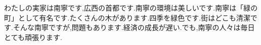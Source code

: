 わたしの実家は南寧です,広西の首都です.南寧の環境は美しいです.南寧は「緑の町」として有名です.たくさんの木があります.四季を緑色です.街はどこも清潔です.そんな南寧ですが,問題もあります.経済の成長が遅い.でも,南寧の人々は毎日とても頑張ります.
